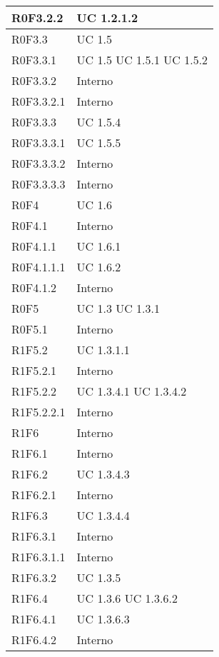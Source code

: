 \begin{center}
\begin{longtable}{| p{4cm} | p{4cm} |}
		\hline
		R0F3.2.2  &  UC 1.2.1.2 \\
		\hline
		R0F3.3  &  UC 1.5 \\
		\hline
		R0F3.3.1  &  UC 1.5 \newline UC 1.5.1 \newline UC 1.5.2 \\
		\hline
		R0F3.3.2  &  Interno \\
		\hline
		R0F3.3.2.1  &  Interno \\
		\hline
		R0F3.3.3  &  UC 1.5.4 \\
		\hline
		R0F3.3.3.1  &  UC 1.5.5 \\
		\hline
		R0F3.3.3.2  &  Interno \\
		\hline
		R0F3.3.3.3  &  Interno \\
		\hline
		R0F4  &  UC 1.6 \\
		\hline
		R0F4.1  &  Interno \\
		\hline
		R0F4.1.1  &  UC 1.6.1 \\
		\hline
		R0F4.1.1.1  &  UC 1.6.2 \\
		\hline
		R0F4.1.2  &  Interno \\
		\hline
		R0F5  &  UC 1.3 \newline UC 1.3.1 \\
		\hline
		R0F5.1  &  Interno \\
		\hline
		R1F5.2  &  UC 1.3.1.1 \\
		\hline
		R1F5.2.1  &  Interno \\
		\hline
		R1F5.2.2  &  UC 1.3.4.1 \newline UC 1.3.4.2 \\
		\hline
		R1F5.2.2.1  &  Interno \\
		\hline
		R1F6  &  Interno \\
		\hline
		R1F6.1  &  Interno \\
		\hline
		R1F6.2  &  UC 1.3.4.3 \\
		\hline
		R1F6.2.1  &  Interno \\
		\hline
		R1F6.3  &  UC 1.3.4.4 \\
		\hline
		R1F6.3.1  &  Interno \\
		\hline
		R1F6.3.1.1  &  Interno \\
		\hline
		R1F6.3.2  &  UC 1.3.5 \\
		\hline
		R1F6.4  &  UC 1.3.6 \newline UC 1.3.6.2 \\
		\hline
		R1F6.4.1  &  UC 1.3.6.3 \\
		\hline
		R1F6.4.2  &  Interno \\

\end{longtable}
\end{center}
